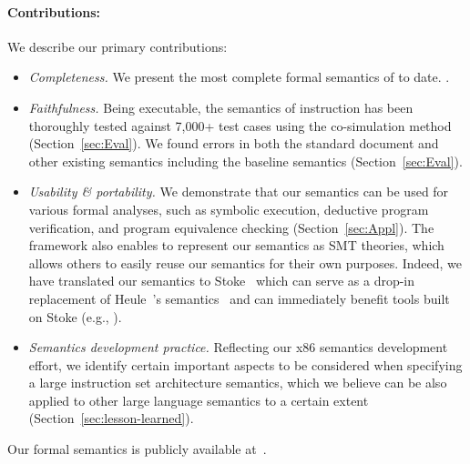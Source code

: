\paragraph{Contributions:}
%
We describe our primary contributions:

\begin{itemize}
\item
\emph{Completeness.}
We present the most complete formal semantics of \ISA to date.
.
\item
\emph{Faithfulness.}
Being executable, the semantics of  instruction has been thoroughly tested against 7,000+ test cases using the co-simulation method (Section~\ref{sec:Eval}).
We found errors in both the \ISA standard document and other existing semantics including the baseline semantics (Section~\ref{sec:Eval}). 
\item
\emph{Usability \& portability.}
We demonstrate that our semantics can be used for various formal analyses, such as symbolic execution, deductive program verification, and program equivalence checking (Section~\ref{sec:Appl}).
The \K framework also enables to represent our semantics as SMT theories,
which allows others to easily reuse our semantics for their own purposes.
Indeed, we have translated our semantics to Stoke~\cite{completing-stock} which can serve as a drop-in replacement of Heule~\etal's semantics~\cite{Heule2016a} and can immediately benefit tools built on Stoke (e.g., \cite{Roessle:CPP19}).
\item
\emph{Semantics development practice.}
Reflecting our x86 semantics development effort, we identify certain important aspects to be considered when specifying a large instruction set architecture semantics, which we believe can be also applied to other large language semantics to a certain extent (Section~\ref{sec:lesson-learned}).
\end{itemize}
%
Our formal semantics is publicly available at~\cite{Suppl}.


